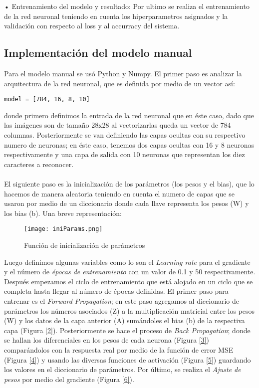 \documentclass[journal]{IEEEtran}
\begin{document}
•	Entrenamiento del modelo y resultado:
Por ultimo se realiza el entrenamiento de la red neuronal teniendo en cuenta los hiperparametros asignados y la validación con respecto al loss y al accurracy del sistema.\\


\subsection{Implementación del modelo manual}
Para el modelo manual se usó Python y Numpy. El primer paso es analizar la arquitectura de la red neuronal, que es definida por medio de un vector así:
\begin{lstlisting}
model = [784, 16, 8, 10]
\end{lstlisting}
donde primero definimos la entrada de la red neuronal que en éste caso, dado que las imágenes son de tamaño 28x28 al vectorizarlas queda un vector de 784 columnas. Posteriormente se van definiendo las capas ocultas con su respectivo numero de neuronas; en éste caso, tenemos dos capas ocultas con 16 y 8 neuronas respectivamente y una capa de salida con  10 neuronas que representan los diez caracteres a reconocer.\\
\\
El siguiente paso es la inicialización de los parámetros (los pesos y el bias), que lo hacemos de manera aleatoria teniendo en cuenta el numero de capas que se usaron por medio de un diccionario donde cada llave representa los pesos (W) y los bias (b). Una breve representación:
\begin{figure} [H]
    \centering
    \texttt{[image: iniParams.png]}
    \caption{Función de inicialización de parámetros}
    \label{1}
\end{figure}
Luego definimos algunas variables como lo son el \textit{Learning rate} para el gradiente y el número de \textit{épocas de entrenamiento} con un valor de 0.1 y 50 respectivamente. Después empezamos el ciclo de entrenamiento que está alojado en un ciclo que se completa hasta llegar al número de épocas definidas. El primer paso para entrenar es el \textit{Forward Propagation}; en este paso agregamos al diccionario de parámetros los números asociados (Z) a la multiplicación matricial entre los pesos (W) y los datos de la capa anterior (A) sumándoles el bias (b) de la respectiva capa (Figura \ref{2}).
Posteriormente se hace el proceso de \textit{Back Propagation}; donde se hallan los diferenciales en los pesos de cada neurona (Figura \ref{3}) comparándolos con la respuesta real por medio de la función de error MSE (Figura \ref{4}) y usando las diversas funciones de activación (Figura \ref{5}) guardando los valores en el diccionario de parámetros. Por último, se realiza el \textit{Ajuste de pesos} por medio del gradiente (Figura \ref{6}).\\
\end{document}
